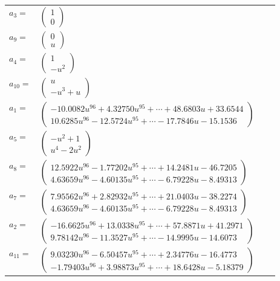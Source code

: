 \documentclass[1p]{elsarticle_modified}
\theoremstyle{definition}
\begin{document}
\begin{tabular}{m{7pt} m{180pt} m{7pt} m{180pt} }
\flushright $a_{3}=$&$\begin{pmatrix}1\\0\end{pmatrix}$ \\
\flushright $a_{9}=$&$\begin{pmatrix}0\\u\end{pmatrix}$ \\
\flushright $a_{4}=$&$\begin{pmatrix}1\\- u^2\end{pmatrix}$ \\
\flushright $a_{10}=$&$\begin{pmatrix}u\\- u^3+u\end{pmatrix}$ \\
\flushright $a_{1}=$&$\begin{pmatrix}-10.0082 u^{96}+4.32750 u^{95}+\cdots+48.6803 u+33.6544\\10.6285 u^{96}-12.5724 u^{95}+\cdots-17.7846 u-15.1536\end{pmatrix}$ \\
\flushright $a_{5}=$&$\begin{pmatrix}- u^2+1\\u^4-2 u^2\end{pmatrix}$ \\
\flushright $a_{8}=$&$\begin{pmatrix}12.5922 u^{96}-1.77202 u^{95}+\cdots+14.2481 u-46.7205\\4.63659 u^{96}-4.60135 u^{95}+\cdots-6.79228 u-8.49313\end{pmatrix}$ \\
\flushright $a_{7}=$&$\begin{pmatrix}7.95562 u^{96}+2.82932 u^{95}+\cdots+21.0403 u-38.2274\\4.63659 u^{96}-4.60135 u^{95}+\cdots-6.79228 u-8.49313\end{pmatrix}$ \\
\flushright $a_{2}=$&$\begin{pmatrix}-16.6625 u^{96}+13.0338 u^{95}+\cdots+57.8871 u+41.2971\\9.78142 u^{96}-11.3527 u^{95}+\cdots-14.9995 u-14.6073\end{pmatrix}$ \\
\flushright $a_{11}=$&$\begin{pmatrix}9.03230 u^{96}-6.50457 u^{95}+\cdots+2.34776 u-16.4773\\-1.79403 u^{96}+3.98873 u^{95}+\cdots+18.6428 u-5.18379\end{pmatrix}$ \\

\end{tabular}
\end{document}
